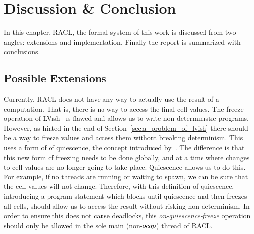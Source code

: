\chapter{Discussion \& Conclusion}
\label{cha:discussion_and_conclusion}

In this chapter, RACL, the formal system of this work is discussed from two
angles: extensions and implementation. Finally the report is summarized with
conclusions.



\section{Possible Extensions}%
\label{sec:extensions}

Currently, RACL does not have any way to actually use the result of a
computation. That is, there is no way to access the final cell values. The
freeze operation of LVish~\parencite{kuper2014freeze} is flawed and allows us to
write non-deterministic programs.  However, as hinted in the end of
Section~\ref{sec:a_problem_of_lvish} there should be a way to freeze values and
access them without breaking determinism.  This uses a form of of quiescence,
the concept introduced by~\textcite{kuper2014freeze}. The difference is that
this new form of freezing needs to be done globally, and at a time where changes
to cell values are no longer going to take place. Quiescence allows us to do
this. For example, if no threads are running or waiting to spawn,
we can be sure that the cell values will not change. Therefore, with this
definition of quiescence, introducing a program statement which blocks until
quiescence and then freezes all cells, should allow us to access the result
without risking non-determinism. In order to ensure this does not cause
deadlocks, this \emph{on-quiescence-freeze} operation should only be allowed in
the sole main (non-$\mbox{$ocap$}$) thread of RACL.

